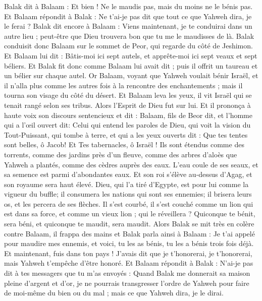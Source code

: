 \begin{multicols}{2}
Balak dit à Balaam : Et bien ! Ne le maudis pas, mais du moins ne le bénis pas.
Et Balaam répondit à Balak : Ne t'ai-je pas dit que tout ce que Yahweh dira, je le ferai ? 
Balak dit encore à Balaam : Viens maintenant, je te conduirai dans un autre lieu ; peut-être que Dieu trouvera bon que tu me le maudisses de là.
Balak conduisit donc Balaam sur le sommet de Peor, qui regarde du côté de Jeshimon.
Et Balaam lui dit : Bâtis-moi ici sept autels, et apprête-moi ici sept veaux et sept béliers.
Et Balak fit donc comme Balaam lui avait dit ; puis il offrit un taureau et un bélier sur chaque autel.
\VerseOne{}Or Balaam, voyant que Yahweh voulait bénir Israël, et il n'alla plus comme les autres fois à la rencontre des enchantements ; mais il tourna son visage du côté du désert.
Et Balaam leva les yeux, il vit Israël qui se tenait rangé selon ses tribus. Alors l'Esprit de Dieu fut sur lui.
Et il prononça à haute voix son discours sentencieux et dit : Balaam, fils de Beor dit, et l'homme qui a l'œil ouvert dit:
Celui qui entend les paroles de Dieu, qui voit la vision du Tout-Puissant, qui tombe à terre, et qui a les yeux ouverts dit :
Que tes tentes sont belles, ô Jacob! Et Tes tabernacles, ô Israël !
Ils sont étendus comme des torrents, comme des jardins près d'un fleuve, comme des arbres d'aloès que Yahweh a plantés, comme des cèdres auprès des eaux.
L'eau coule de ses seaux, et sa semence est parmi d'abondantes eaux. Et son roi s'élève au-dessus d'Agag, et son royaume sera haut élevé.
Dieu, qui l'a tiré d'Egypte, est pour lui comme la vigueur du buffle; il consumera les nations qui sont ses ennemies; il brisera leurs os, et les percera de ses flèches.
Il s'est courbé, il s'est couché comme un lion qui est dans sa force, et comme un vieux lion ; qui le réveillera ? Quiconque te bénit, sera béni, et quiconque te maudit, sera maudit.
Alors Balak se mit très en colère contre Balaam, il frappa des mains et Balak parla ainsi à Balaam : Je t’ai appelé pour maudire mes ennemis, et voici, tu les as bénis, tu les a bénis trois fois déjà.
Et maintenant, fuis dans ton pays  ! J'avais dit que je t’honorerai, je t’honorerai, mais Yahweh t'empêche d’être honoré.
Et Balaam répondit à Balak : N'ai-je pas dit à tes messagers que tu m'as envoyés :
Quand Balak me donnerait sa maison pleine d'argent et d'or, je ne pourrais transgresser l'ordre de Yahweh pour faire de moi-même du bien ou du mal ; mais ce que Yahweh dira, je le dirai.

\end{multicols}
